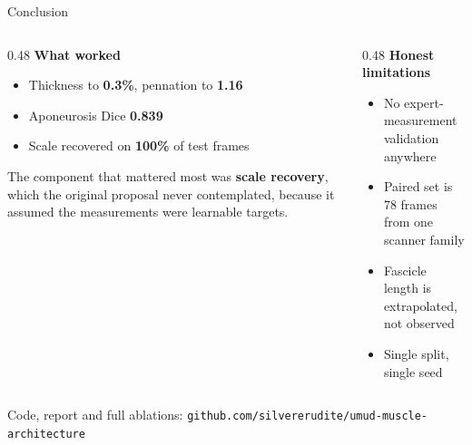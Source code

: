 \documentclass[aspectratio=169,11pt]{beamer}
\newcommand{\hl}[1]{\textcolor{Accent}{\textbf{#1}}}
\newcommand{\num}[1]{\textcolor{Ink}{\textbf{#1}}}
\begin{document}
\begin{frame}{Conclusion}
  \begin{columns}[T]
  \begin{column}{0.48\textwidth}
    {\small\textbf{What worked}}
    \begin{itemize}\setlength\itemsep{0.12cm}
      \item {\small Thickness to \num{0.3\%}, pennation to \num{1.16\textdegree}}
      \item {\small Aponeurosis Dice \num{0.839}}
      \item {\small Scale recovered on \num{100\%} of test frames}
    \end{itemize}
    \vspace{0.25cm}
    {\footnotesize The component that mattered most was \hl{scale recovery},
    which the original proposal never contemplated, because it assumed the
    measurements were learnable targets.}
  \end{column}
  \begin{column}{0.48\textwidth}
    {\small\textbf{Honest limitations}}
    \begin{itemize}\setlength\itemsep{0.12cm}
      \item {\small No expert-measurement validation anywhere}
      \item {\small Paired set is 78 frames from one scanner family}
      \item {\small Fascicle length is extrapolated, not observed}
      \item {\small Single split, single seed}
    \end{itemize}
  \end{column}
  \end{columns}
  \vspace{0.4cm}

  \begin{center}
  {\small\color{Muted}
  Code, report and full ablations:
  \texttt{github.com/silvererudite/umud-muscle-architecture}}
  \end{center}
\end{frame}
\end{document}

